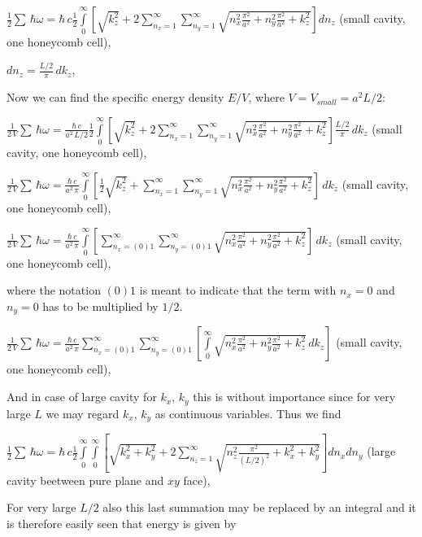 \documentclass[11pt]{article}
\begin{document}
    \(\frac{1}{2}\sum\,\hbar\omega = \hbar\,c\frac{1}{2}\int\limits_{0}^{\infty}\left[{\sqrt{k_z^2}+2\sum\limits_{n_x=1}^{\infty}\sum\limits_{n_y=1}^{\infty}\sqrt{n_x^2\frac{\pi^2}{a^2}+n_y^2\frac{\pi^2}{a^2}+k_z^2}}\right]d{n_z}\)
(small cavity, one honeycomb cell),

    \(dn_z = \frac{L/2}{\pi}\,dk_z\),

    Now we can find the specific energy density \(E/V\), where
\(V = V_{small} = a^2 L/2\):

    \(\frac{1}{2\,V}\sum\,\hbar\omega = \frac{\hbar\,c}{a^2\,L/2}\frac{1}{2}\int\limits_{0}^{\infty}\left[{\sqrt{k_z^2}+2\sum\limits_{n_x=1}^{\infty}\sum\limits_{n_y=1}^{\infty}\sqrt{n_x^2\frac{\pi^2}{a^2}+n_y^2\frac{\pi^2}{a^2}+k_z^2}}\right]\frac{L/2}{\pi}\,dk_z\)
(small cavity, one honeycomb cell),

    \(\frac{1}{2\,V}\sum\,\hbar\omega = \frac{\hbar\,c}{a^2\,\pi}\int\limits_{0}^{\infty}\left[{\frac{1}{2}\sqrt{k_z^2}+\sum\limits_{n_x=1}^{\infty}\sum\limits_{n_y=1}^{\infty}\sqrt{n_x^2\frac{\pi^2}{a^2}+n_y^2\frac{\pi^2}{a^2}+k_z^2}}\right]\,dk_z\)
(small cavity, one honeycomb cell),

    \(\frac{1}{2\,V}\sum\,\hbar\omega = \frac{\hbar\,c}{a^2\,\pi}\int\limits_{0}^{\infty}\left[{\sum\limits_{n_x=(0)1}^{\infty}\sum\limits_{n_y=(0)1}^{\infty}\sqrt{n_x^2\frac{\pi^2}{a^2}+n_y^2\frac{\pi^2}{a^2}+k_z^2}}\right]\,dk_z\)
(small cavity, one honeycomb cell),

    where the notation \(\left(0\right) 1\) is meant to indicate that the
term with \(n_x = 0\) and \(n_y = 0\) has to be multiplied by
\(1\big/2\).

    \(\frac{1}{2\,V}\sum\,\hbar\omega = \frac{\hbar\,c}{a^2\,\pi}\sum\limits_{n_x=(0)1}^{\infty}\sum\limits_{n_y=(0)1}^{\infty}\left[\int\limits_{0}^{\infty}\sqrt{n_x^2\frac{\pi^2}{a^2}+n_y^2\frac{\pi^2}{a^2}+k_z^2}\,dk_z\right]\)
(small cavity, one honeycomb cell),

    And in case of large cavity for \(k_x\), \(k_y\) this is without
importance since for very large \(L\) we may regard \(k_x\), \(k_y\) as
continuous variables. Thus we find

    \(\frac{1}{2}\sum\,\hbar\omega = \hbar\,c\frac{1}{2}\int\limits_{0}^{\infty}\int\limits_{0}^{\infty}\left[{\sqrt{k_x^2+k_y^2}+2\sum\limits_{n_z=1}^{\infty}\sqrt{n_z^2\frac{\pi^2}{(L/2)^2}+k_x^2+k_y^2}}\right]d{n_x}d{n_y}\)
(large cavity beetween pure plane and \(xy\) face),

    For very large \(L/2\) also this last summation may be replaced by an
integral and it is therefore easily seen that energy is given by
\end{document}
